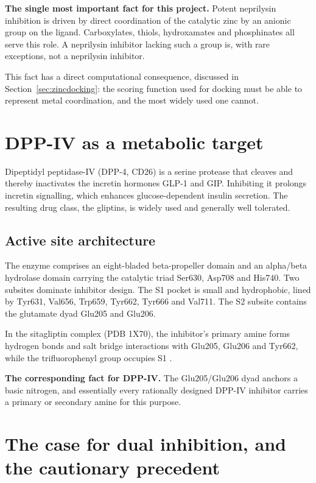 \documentclass[11pt,a4paper]{article}
\begin{document}
\begin{keybox}
\textbf{The single most important fact for this project.} Potent neprilysin
inhibition is driven by direct coordination of the catalytic zinc by an anionic
group on the ligand. Carboxylates, thiols, hydroxamates and phosphinates all
serve this role. A neprilysin inhibitor lacking such a group is, with rare
exceptions, not a neprilysin inhibitor.
\end{keybox}

This fact has a direct computational consequence, discussed in
Section~\ref{sec:zincdocking}: the scoring function used for docking must be
able to represent metal coordination, and the most widely used one cannot.

\section{DPP-IV as a metabolic target}

Dipeptidyl peptidase-IV (DPP-4, CD26) is a serine protease that cleaves and
thereby inactivates the incretin hormones GLP-1 and GIP. Inhibiting it
prolongs incretin signalling, which enhances glucose-dependent insulin
secretion. The resulting drug class, the gliptins, is widely used and generally
well tolerated.

\subsection{Active site architecture}

The enzyme comprises an eight-bladed beta-propeller domain and an
alpha/beta hydrolase domain carrying the catalytic triad Ser630, Asp708 and
His740. Two subsites dominate inhibitor design. The S1 pocket is small and
hydrophobic, lined by Tyr631, Val656, Trp659, Tyr662, Tyr666 and Val711. The S2
subsite contains the glutamate dyad Glu205 and Glu206.

In the sitagliptin complex (PDB 1X70), the inhibitor's primary amine forms
hydrogen bonds and salt bridge interactions with Glu205, Glu206 and Tyr662,
while the trifluorophenyl group occupies S1 \cite{kim2005}.

\begin{keybox}
\textbf{The corresponding fact for DPP-IV.} The Glu205/Glu206 dyad anchors a
basic nitrogen, and essentially every rationally designed DPP-IV inhibitor
carries a primary or secondary amine for this purpose.
\end{keybox}

\section{The case for dual inhibition, and the cautionary precedent}
\end{document}
